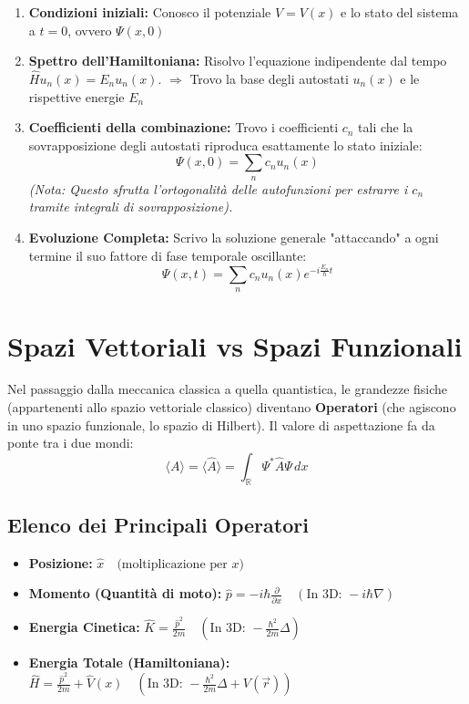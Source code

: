\documentclass[11pt, a4paper]{article}
\begin{document}
\begin{enumerate}
    \item \textbf{Condizioni iniziali:} Conosco il potenziale $V = V(x)$ e lo stato del sistema a $t=0$, ovvero $\Psi(x,0)$ %
    \item \textbf{Spettro dell'Hamiltoniana:} Risolvo l'equazione indipendente dal tempo $\hat{H}u_n(x) = E_n u_n(x)$. $\Rightarrow$ Trovo la base degli autostati $u_n(x)$ e le rispettive energie $E_n$ %
    \item \textbf{Coefficienti della combinazione:} Trovo i coefficienti $c_n$ tali che la sovrapposizione degli autostati riproduca esattamente lo stato iniziale: %
    \begin{equation*}
        \Psi(x,0) = \sum_n c_n u_n(x) %
    \end{equation*}
    \textit{(Nota: Questo sfrutta l'ortogonalità delle autofunzioni per estrarre i $c_n$ tramite integrali di sovrapposizione).}
    \item \textbf{Evoluzione Completa:} Scrivo la soluzione generale "attaccando" a ogni termine il suo fattore di fase temporale oscillante: %
    \begin{equation*}
        \Psi(x,t) = \sum_n c_n u_n(x) e^{-i\frac{E_n}{\hbar}t} %
    \end{equation*}
\end{enumerate}

\section{Spazi Vettoriali vs Spazi Funzionali} %

Nel passaggio dalla meccanica classica a quella quantistica, le grandezze fisiche (appartenenti allo spazio vettoriale classico) diventano \textbf{Operatori} (che agiscono in uno spazio funzionale, lo spazio di Hilbert). %
Il valore di aspettazione fa da ponte tra i due mondi: %
\begin{equation*}
    \langle A \rangle = \langle \hat{A} \rangle = \int_{\mathbb{R}} \Psi^* \hat{A} \Psi \, dx %
\end{equation*}

\subsection{Elenco dei Principali Operatori} %

\begin{itemize}
    \item \textbf{Posizione:} $\hat{x} \quad \text{(moltiplicazione per } x \text{)}$ %
    \item \textbf{Momento (Quantità di moto):} $\hat{p} = -i\hbar \frac{\partial}{\partial x} \quad \left( \text{In 3D: } -i\hbar\nabla \right)$ %
    \item \textbf{Energia Cinetica:} $\hat{K} = \frac{\hat{p}^2}{2m} \quad \left( \text{In 3D: } -\frac{\hbar^2}{2m}\Delta \right)$ %
    \item \textbf{Energia Totale (Hamiltoniana):} $\hat{H} = \frac{\hat{p}^2}{2m} + \hat{V}(x) \quad \left( \text{In 3D: } -\frac{\hbar^2}{2m}\Delta + V(\vec{r}) \right)$ %
\end{itemize}
\end{document}
